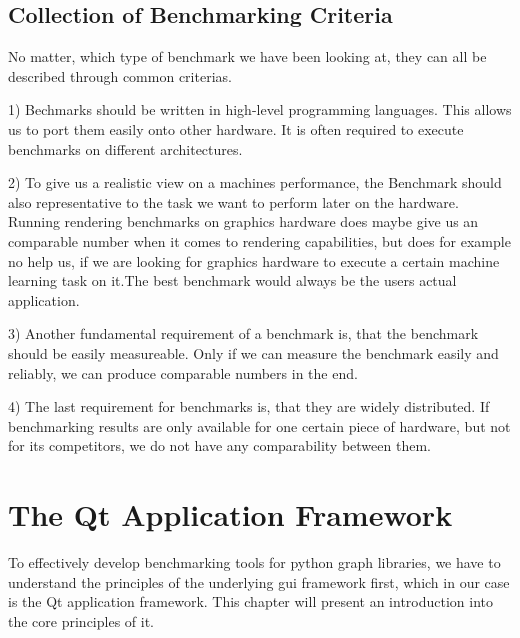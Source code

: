 
\subsection{Collection of Benchmarking Criteria}

No matter, which type of benchmark we have been looking at, they can all be
described through common criterias.

1) Bechmarks should be written in high-level programming languages. This allows
us to port them easily onto other hardware. It is often required to execute
benchmarks on different architectures.

2) To give us a realistic view on a machines performance, the Benchmark should
also representative to the task we want to perform later on the hardware.
Running rendering benchmarks on graphics hardware does maybe give us an
comparable number when it comes to rendering capabilities, but does for example
no help us, if we are looking for graphics hardware to execute a certain machine
learning task on it.The best benchmark would always be the users actual
application.

3) Another fundamental requirement of a benchmark is, that the benchmark should
be easily measureable. Only if we can measure the benchmark easily and reliably,
we can produce comparable numbers in the end. 

4) The last requirement for benchmarks is, that they are widely distributed. If
benchmarking results are only available for one certain piece of hardware, but
not for its competitors, we do not have any comparability between them.





\section{The Qt Application Framework}
\label{sec:fundamentals:qt}

To effectively develop benchmarking tools for python graph libraries, we have to
understand the principles of the underlying \gls{gui} framework first, which in
our case is the Qt application framework. This chapter will present an
introduction into the core principles of it.




